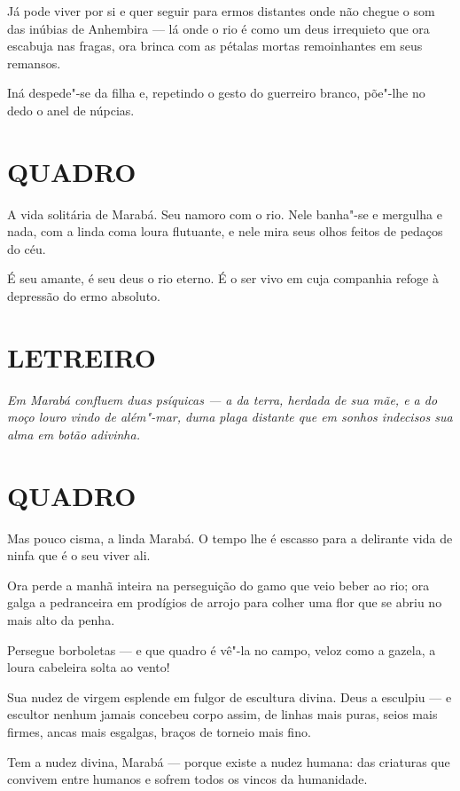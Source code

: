 Já pode viver por si e quer seguir para ermos distantes onde não chegue
o som das inúbias de Anhembira --- lá onde o rio é como um deus
irrequieto que ora escabuja nas fragas, ora brinca com as pétalas mortas
remoinhantes em seus remansos.

Iná despede"-se da filha e, repetindo o gesto do guerreiro branco,
põe"-lhe no dedo o anel de núpcias.

\section*{QUADRO}

A vida solitária de Marabá. Seu namoro com o rio. Nele banha"-se e
mergulha e nada, com a linda coma loura flutuante, e nele mira seus
olhos feitos de pedaços do céu.

É seu amante, é seu deus o rio eterno. É o ser vivo em cuja companhia
refoge à depressão do ermo absoluto.

\section*{LETREIRO}

\emph{Em Marabá confluem duas psíquicas --- a da terra, herdada de sua
mãe, e a do moço louro vindo de além"-mar, duma plaga distante que em
sonhos indecisos sua alma em botão adivinha.}

\section*{QUADRO}

Mas pouco cisma, a linda Marabá. O tempo lhe é escasso para a delirante
vida de ninfa que é o seu viver ali.

Ora perde a manhã inteira na perseguição do gamo que veio beber ao rio;
ora galga a pedranceira em prodígios de arrojo para colher uma flor que
se abriu no mais alto da penha.

Persegue borboletas --- e que quadro é vê"-la no campo, veloz como a
gazela, a loura cabeleira solta ao vento!

Sua nudez de virgem esplende em fulgor de escultura divina. Deus a
esculpiu --- e escultor nenhum jamais concebeu corpo assim, de linhas
mais puras, seios mais firmes, ancas mais esgalgas, braços de torneio
mais fino.

Tem a nudez divina, Marabá --- porque existe a nudez humana: das
criaturas que convivem entre humanos e sofrem todos os vincos da
humanidade.

